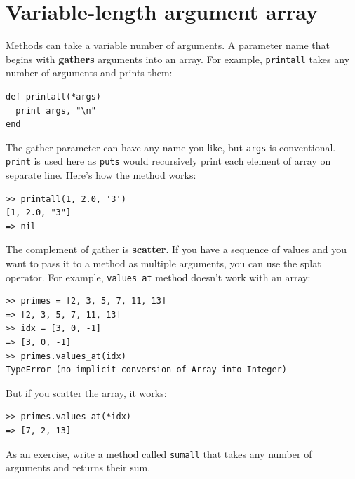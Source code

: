 \documentclass[10pt]{book}
\begin{document}
\section{Variable-length argument array}
\label{gather}

Methods can take a variable number of arguments.  A parameter
name that begins with {\tt *} {\bf gathers} arguments into
an array.  For example, {\tt printall}
takes any number of arguments and prints them:

\begin{verbatim}
def printall(*args)
  print args, "\n"
end
\end{verbatim}
%
The gather parameter can have any name you like, but {\tt args} is
conventional.  {\tt print} is used here as {\tt puts} would recursively print
each element of array on separate line.  Here's how the method works:

\begin{verbatim}
>> printall(1, 2.0, '3')
[1, 2.0, "3"]
=> nil
\end{verbatim}
%
The complement of gather is {\bf scatter}.  If you have a
sequence of values and you want to pass it to a method
as multiple arguments, you can use the {\tt *} splat operator.
For example, {\tt values\_at} method doesn't work with an array:

\begin{verbatim}
>> primes = [2, 3, 5, 7, 11, 13]
=> [2, 3, 5, 7, 11, 13]
>> idx = [3, 0, -1]
=> [3, 0, -1]
>> primes.values_at(idx)
TypeError (no implicit conversion of Array into Integer)
\end{verbatim}
%
But if you scatter the array, it works:

\begin{verbatim}
>> primes.values_at(*idx)
=> [7, 2, 13]
\end{verbatim}
%
%
As an exercise, write a method called {\tt sumall} that takes any number
of arguments and returns their sum.
\end{document}
